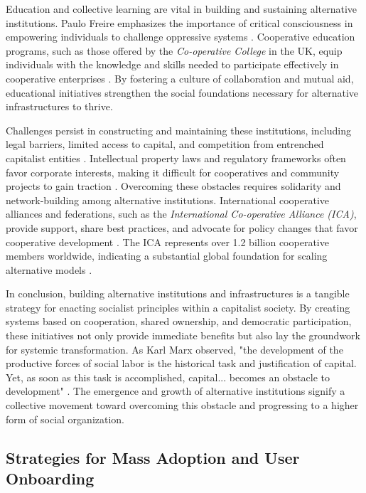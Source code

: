 \begin{refsection}
Education and collective learning are vital in building and sustaining alternative institutions. Paulo Freire emphasizes the importance of critical consciousness in empowering individuals to challenge oppressive systems \cite[pp.~200-202]{Freire2000}. Cooperative education programs, such as those offered by the \textit{Co-operative College} in the UK, equip individuals with the knowledge and skills needed to participate effectively in cooperative enterprises \cite[pp.~85-88]{CooperativeCollege2020}. By fostering a culture of collaboration and mutual aid, educational initiatives strengthen the social foundations necessary for alternative infrastructures to thrive.

Challenges persist in constructing and maintaining these institutions, including legal barriers, limited access to capital, and competition from entrenched capitalist entities \cite[pp.~102-105]{Restakis2010}. Intellectual property laws and regulatory frameworks often favor corporate interests, making it difficult for cooperatives and community projects to gain traction \cite[pp.~150-152]{Soderberg2008}. Overcoming these obstacles requires solidarity and network-building among alternative institutions. International cooperative alliances and federations, such as the \textit{International Co-operative Alliance (ICA)}, provide support, share best practices, and advocate for policy changes that favor cooperative development \cite[pp.~160-163]{ICA2020}. The ICA represents over 1.2 billion cooperative members worldwide, indicating a substantial global foundation for scaling alternative models \cite[pp.~161]{ICA2020}.

In conclusion, building alternative institutions and infrastructures is a tangible strategy for enacting socialist principles within a capitalist society. By creating systems based on cooperation, shared ownership, and democratic participation, these initiatives not only provide immediate benefits but also lay the groundwork for systemic transformation. As Karl Marx observed, "the development of the productive forces of social labor is the historical task and justification of capital. Yet, as soon as this task is accomplished, capital... becomes an obstacle to development" \cite[pp.~490-491]{Marx1976}. The emergence and growth of alternative institutions signify a collective movement toward overcoming this obstacle and progressing to a higher form of social organization.

\subsection{Strategies for Mass Adoption and User Onboarding}


\end{refsection}
